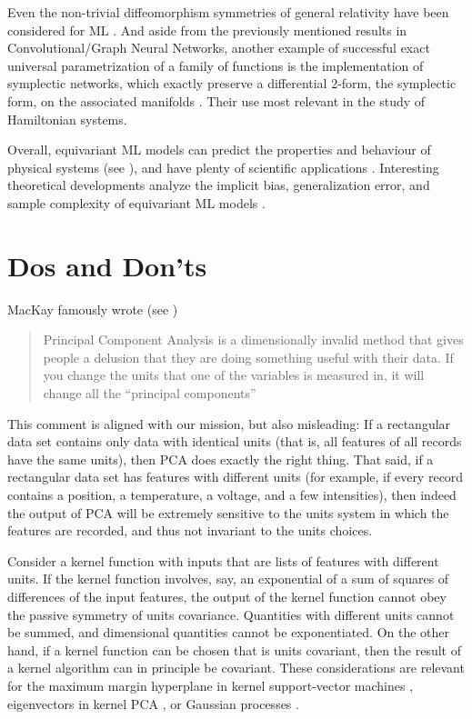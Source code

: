 \documentclass[accepted]{article}
\begin{document}
Even the non-trivial diffeomorphism symmetries of general relativity have been considered for ML \citep{weiler}. And aside from the previously mentioned results in Convolutional/Graph Neural Networks, another example of successful exact universal parametrization of a family of functions is the implementation of symplectic networks, which exactly preserve a differential 2-form, the symplectic form, on the associated manifolds \citep{sympnets,henonnets}. Their use most relevant in the study of Hamiltonian systems. 
 
Overall, equivariant ML models can predict the properties and behaviour of physical systems (see \citealt{cheng2019covariance}), and have plenty of scientific applications \citep{batzner20223, musaelian2022learning, stark2022equibind, yu-physics, wang2022approximately}. Interesting theoretical developments analyze the implicit bias, generalization error, and sample complexity of equivariant ML models \citep{petrache2023approximation,lawrence2021implicit, bietti2021sample, elesedy2021provably, elesedy2021kernel, huang2023approximately, mei2021learning}.

\section{Dos and Don'ts}\label{sec:dos}
MacKay famously wrote (see \citealt{muldoonmedium})
\begin{quote}Principal Component Analysis is a dimensionally invalid method that gives people a delusion that they are doing something useful with their data. If you change the units that one of the variables is measured in, it will change all the ``principal components''\end{quote}
This comment is aligned with our mission, but also misleading: If a rectangular data set contains only data with identical units (that is, all features of all records have the same units), then PCA does exactly the right thing.
That said, if a rectangular data set has features with different units (for example, if every record contains a position, a temperature, a voltage, and a few intensities), then indeed the output of PCA will be extremely sensitive to the units system in which the features are recorded, and thus not invariant to the units choices.

Consider a kernel function with inputs that are lists of features with different units.
If the kernel function involves, say, an exponential of a sum of squares of differences of the input features, the output of the kernel function cannot obey the passive symmetry of units covariance.
Quantities with different units cannot be summed, and dimensional quantities cannot be exponentiated. 
On the other hand, if a kernel function can be chosen that is units covariant, then the result of a kernel algorithm can in principle be covariant.
These considerations are relevant for the maximum margin hyperplane in kernel support-vector machines \citep{ksvm}, eigenvectors in kernel PCA \citep{SchSmo02}, or Gaussian processes \citep{gpml}.
\end{document}
